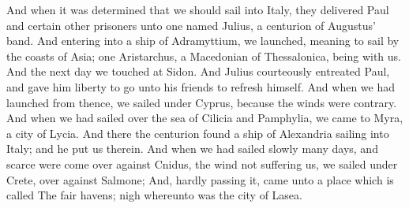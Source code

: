  And when it was determined that we should sail into
Italy, they delivered Paul and certain other prisoners unto one named
Julius, a centurion of Augustus' band.  And entering into
a ship of Adramyttium, we launched, meaning to sail by the coasts of
Asia; one Aristarchus, a Macedonian of Thessalonica, being with us.
 And the next day we touched at Sidon. And Julius
courteously entreated Paul, and gave him liberty to go unto his friends
to refresh himself.  And when we had launched from thence,
we sailed under Cyprus, because the winds were contrary. 
And when we had sailed over the sea of Cilicia and Pamphylia, we came to
Myra, a city of Lycia.  And there the centurion found a
ship of Alexandria sailing into Italy; and he put us therein.
 And when we had sailed slowly many days, and scarce were
come over against Cnidus, the wind not suffering us, we sailed under
Crete, over against Salmone;  And, hardly passing it, came
unto a place which is called The fair havens; nigh whereunto was the
city of Lasea.

